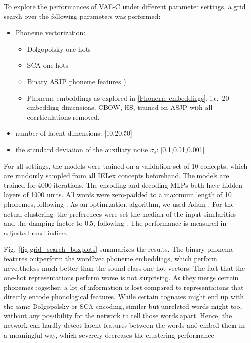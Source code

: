 \documentclass[6pt]{article}
\begin{document}
To explore the performances of VAE-C under different parameter settings, a grid search over the following parameters was performed:
\begin{itemize}
\item Phoneme vectorization:  \begin{itemize}
\item Dolgopolsky one hots \citep[cf.~\ref{Hand-crafted Vectorization Models};][]{dolgopolsky1986probabilistic,list2012sca}
\item SCA one hots \citep[cf.~\ref{Hand-crafted Vectorization Models};][]{list2012sca}
\item Binary ASJP phoneme features \citep[cf.~\ref{Hand-crafted Vectorization Models};][]{rama2016siamese})
\item Phoneme embeddings as explored in \ref{Phoneme embeddings}, i.e.\ 20 embedding dimensions, CBOW, HS, trained on ASJP with all coarticulations removed. 
\end{itemize}
\item number of latent dimensions:  [10,20,50]
\item the standard deviation of the auxiliary noise $\sigma_{\epsilon}$: [0.1,0.01,0.001]
\end{itemize}
For all settings, the models were trained on a validation set of 10 concepts, which are randomly sampled from all IELex concepts beforehand. The models are trained for 4000 iterations. The encoding and decoding MLPs both have hidden layers of 1000 units. All words were zero-padded to a maximum length of 10 phonemes, following \cite{rama2016siamese}. As an optimization algorithm, we used Adam \citep{kingma2014adam}. For the actual clustering, the preferences were set the median of the input similarities and the damping factor to 0.5, following \cite[p. 972]{frey2007clustering}. The performance is measured in adjusted rand indices \citep{rand1971objective,hubert1985comparing}. 

Fig.~\ref{fig:grid_search_boxplots} summarizes the results. The binary phoneme features outperform the word2vec phoneme embeddings, which perform nevertheless much better than the sound class one hot vectors. The fact that the one-hot representations perform worse is not surprising. As they merge certain phonemes together, a lot of information is lost compared to representations that directly encode phonological features. While certain cognates might end up with the same Dolgopolsky or SCA encoding, similar but unrelated words might too, without any possibility for the network to tell those words apart. Hence, the network can hardly detect latent features between the words and embed them in a meaningful way, which severely decreases the clustering performance.
\end{document}
